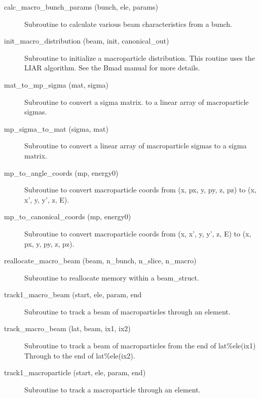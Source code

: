 \begin{description}

\item[calc_macro_bunch_params (bunch, ele, params)] \Newline
Subroutine to calculate various beam characteristics from a bunch.

\item[init_macro_distribution (beam, init, canonical_out)] \Newline 
Subroutine to initialize a macroparticle distribution.
This routine uses the LIAR algorithm. See the Bmad manual for more details.

\item[mat_to_mp_sigma (mat, sigma)] \Newline 
Subroutine to convert a sigma matrix. to a linear array of 
macroparticle sigmas.

\item[mp_sigma_to_mat (sigma, mat)] \Newline 
Subroutine to convert a linear array of macroparticle sigmas to a 
sigma matrix. 

\item[mp_to_angle_coords (mp, energy0)] \Newline 
Subroutine to convert macroparticle coords from 
(x, px, y, py, z, pz) to (x, x', y, y', z, E).

\item[mp_to_canonical_coords (mp, energy0)] \Newline 
Subroutine to convert macroparticle coords from 
(x, x', y, y', z, E) to (x, px, y, py, z, pz).

\item[reallocate_macro_beam (beam, n_bunch, n_slice, n_macro)] \Newline 
Subroutine to reallocate memory within a beam_struct.

\item[track1_macro_beam (start, ele, param, end] \Newline
Subroutine to track a beam of macroparticles through an element.

\item[track_macro_beam (lat, beam, ix1, ix2)] \Newline 
Subroutine to track a beam of macroparticles from the end of
lat\%ele(ix1) Through to the end of lat\%ele(ix2).

\item[track1_macroparticle (start, ele, param, end)] \Newline 
Subroutine to track a macroparticle through an element.

\end{description}

